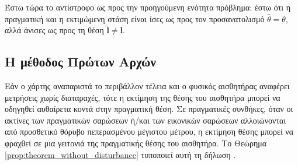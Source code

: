 Έστω τώρα το αντίστροφο ως προς την προηγούμενη ενότητα πρόβλημα:
έστω ότι η πραγματική και η εκτιμώμενη στάση είναι ίσες ως προς τον
προσανατολισμό $\hat{\theta} = \theta$, αλλά άνισες ως προς τη θέση
$\hat{\bm{l}} \neq \bm{l}$.

\subsection{Η μέθοδος Πρώτων Αρχών}
\label{subsection:02_04_03:01}

Εάν ο χάρτης αναπαριστά το περιβάλλον τέλεια και ο φυσικός αισθητήρας αναφέρει
μετρήσεις χωρίς διαταραχές, τότε η εκτίμηση της θέσης του αισθητήρα μπορεί να
οδηγηθεί αυθαίρετα κοντά στην πραγματική θέση. Σε πραγματικές συνθήκες, όταν οι
ακτίνες των πραγματικών σαρώσεων ή/και των εικονικών σαρώσεων αλλοιώνονται από
προσθετικό θόρυβο πεπερασμένου μέγιστου μέτρου, η εκτίμηση θέσης μπορεί να
φραχθεί σε μια γειτονιά της πραγματικής θέσης του αισθητήρα. Το Θεώρημα
\ref{prop:theorem_without_disturbance} τυποποιεί αυτή τη δήλωση
\cite{Filotheou2022d}.

